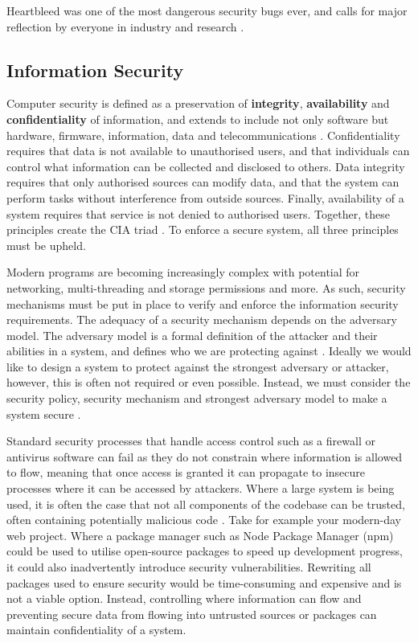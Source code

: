 \documentclass[twocolumn]{article}
\begin{document}
Heartbleed was one of the most dangerous security bugs ever, and calls for major reflection by everyone in industry and research \cite{balliu2014logics}.

\subsection{Information Security}

Computer security is defined as a preservation of \textbf{integrity}, \textbf{availability} and \textbf{confidentiality} of information, and extends to include not only software but hardware, firmware, information, data and telecommunications \cite{guttman1995introduction}.
Confidentiality requires that data is not available to unauthorised users, and that individuals can control what information can be collected and disclosed to others. Data integrity requires that only authorised sources can modify data, and that the system can perform tasks without interference from outside sources. Finally, availability of a system requires that service is not denied to authorised users. Together, these principles create the CIA triad \cite{stallings2012computer}. To enforce a secure system, all three principles must be upheld.

Modern programs are becoming increasingly complex with potential for networking, multi-threading and storage permissions and more. As such, security mechanisms must be put in place to verify and enforce the information security requirements. The adequacy of a security mechanism depends on the adversary model. The adversary model is a formal definition of the attacker and their abilities in a system, and defines who we are protecting against \cite{do2019role}. Ideally we would like to design a system to protect against the strongest adversary or attacker, however, this is often not required or even possible. Instead, we must consider the security policy, security mechanism and strongest adversary model to make a system secure \cite{balliu2014logics}.

Standard security processes that handle access control such as a firewall or antivirus software can fail as they do not constrain where information is allowed to flow, meaning that once access is granted it can propagate to insecure processes where it can be accessed by attackers. Where a large system is being used, it is often the case that not all components of the codebase can be trusted, often containing potentially malicious code \cite{sabelfeld2003language}. Take for example your modern-day web project. Where a package manager such as Node Package Manager (npm) could be used to utilise open-source packages to speed up development progress, it could also inadvertently introduce security vulnerabilities. Rewriting all packages used to ensure security would be time-consuming and expensive and is not a viable option. Instead, controlling where information can flow and preventing secure data from flowing into untrusted sources or packages can maintain confidentiality of a system.
\end{document}
